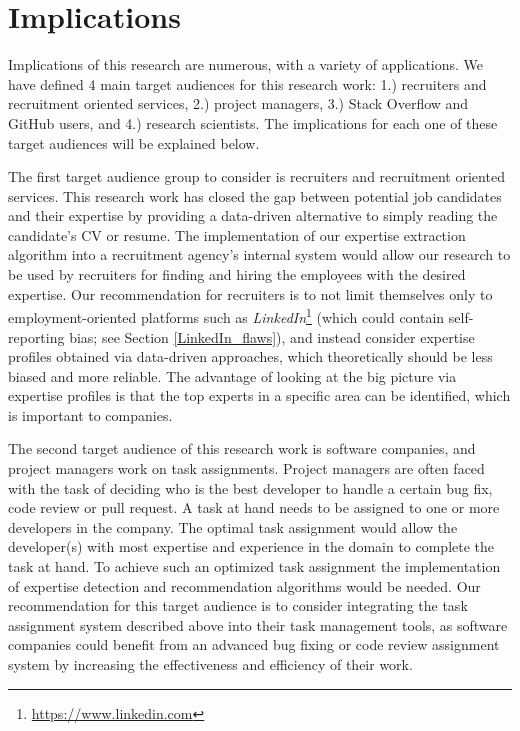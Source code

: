     \section{Implications\label{sec:implications}}
    
        Implications of this research are numerous, with a variety of applications. We have defined 4 main target audiences for this research work: 1.) recruiters and recruitment oriented services, 2.) project managers, 3.) Stack Overflow and GitHub users, and 4.) research scientists. The implications for each one of these target audiences will be explained below. 
        
        The first target audience group to consider is recruiters and recruitment oriented services. This research work has closed the gap between potential job candidates and their expertise by providing a data-driven alternative to simply reading the candidate's CV or resume. The implementation of our expertise extraction algorithm into a recruitment agency's internal system would allow our research to be used by recruiters for finding and hiring the employees with the desired expertise. Our recommendation for recruiters is to not limit themselves only to employment-oriented platforms such as \emph{LinkedIn}\footnote{\url{https://www.linkedin.com}} (which could contain self-reporting bias; see Section \ref{LinkedIn_flaws}), and instead consider expertise profiles obtained via data-driven approaches, which theoretically should be less biased and more reliable. The advantage of looking at the big picture via expertise profiles is that the top experts in a specific area can be identified, which is important to companies.
        
        The second target audience of this research work is software companies, and project managers work on task assignments. Project managers are often faced with the task of deciding who is the best developer to handle a certain bug fix, code review or pull request. A task at hand needs to be assigned to one or more developers in the company. The optimal task assignment would allow the developer(s) with most expertise and experience in the domain to complete the task at hand. To achieve such an optimized task assignment the implementation of expertise detection and recommendation algorithms would be needed. Our recommendation for this target audience is to consider integrating the task assignment system described above into their task management tools, as software companies could benefit from an advanced bug fixing or code review assignment system by increasing the effectiveness and efficiency of their work.
         
